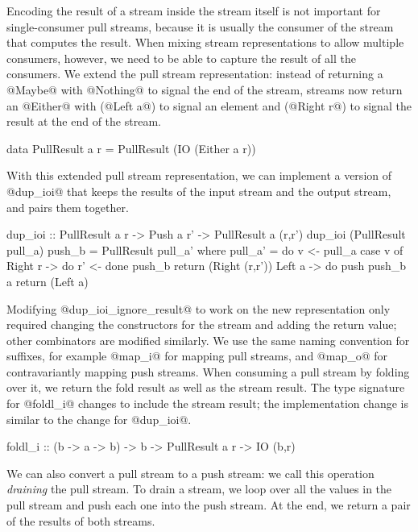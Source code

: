 Encoding the result of a stream inside the stream itself is not important for single-consumer pull streams, because it is usually the consumer of the stream that computes the result.
When mixing stream representations to allow multiple consumers, however, we need to be able to capture the result of all the consumers.
We extend the pull stream representation: instead of returning a @Maybe@ with @Nothing@ to signal the end of the stream, streams now return an @Either@ with (@Left a@) to signal an element and (@Right r@) to signal the result at the end of the stream.

\begin{haskell}
data PullResult a r = PullResult (IO (Either a r))
\end{haskell}

With this extended pull stream representation, we can implement a version of @dup_ioi@ that keeps the results of the input stream and the output stream, and pairs them together.

\begin{haskell}
dup_ioi :: PullResult a r -> Push a r' -> PullResult a (r,r')
dup_ioi (PullResult pull_a) push_b = PullResult pull_a'
 where
  pull_a' = do
    v <- pull_a
    case v of
     Right r -> do
      r' <- done push_b
      return (Right (r,r'))
     Left a -> do
      push push_b a
      return (Left a)
\end{haskell}

Modifying @dup_ioi_ignore_result@ to work on the new representation only required changing the constructors for the stream and adding the return value; other combinators are modified similarly.
We use the same naming convention for suffixes, for example @map_i@ for mapping pull streams, and @map_o@ for contravariantly mapping push streams.
When consuming a pull stream by folding over it, we return the fold result as well as the stream result.
The type signature for @foldl_i@ changes to include the stream result; the implementation change is similar to the change for @dup_ioi@.

\begin{haskell}
foldl_i :: (b -> a -> b) -> b -> PullResult a r -> IO (b,r)
\end{haskell}

We can also convert a pull stream to a push stream: we call this operation \emph{draining} the pull stream.
To drain a stream, we loop over all the values in the pull stream and push each one into the push stream.
At the end, we return a pair of the results of both streams.

